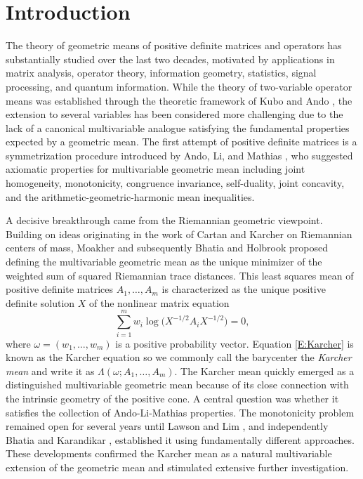 \documentclass[12pt,reqno]{amsart}
\begin{document}
\section{Introduction}
The theory of geometric means of positive definite matrices and operators has substantially studied over the last two decades, motivated by applications in matrix analysis, operator theory, information geometry, statistics, signal processing, and quantum information.
While the theory of two-variable operator means was established through the theoretic framework of Kubo and Ando \cite{KA}, the extension to several variables has been considered more challenging due to the lack of a canonical  multivariable analogue satisfying the fundamental properties expected by a geometric mean.
The first attempt of positive definite matrices is a symmetrization procedure introduced by Ando, Li, and Mathias \cite{ALM}, who suggested axiomatic properties for  multivariable geometric mean including joint homogeneity, monotonicity, congruence invariance, self-duality, joint concavity, and the arithmetic-geometric-harmonic mean inequalities.

A decisive breakthrough came from the Riemannian geometric viewpoint. Building on ideas originating in the work of Cartan and Karcher on Riemannian centers of mass, Moakher \cite{Mo} and subsequently Bhatia and Holbrook \cite{BH} proposed defining the  multivariable geometric mean as the unique minimizer of the weighted sum of squared Riemannian trace distances.
This least squares mean of positive definite matrices $A_{1}, \dots, A_{m}$ is characterized as the unique positive definite solution $X$ of the nonlinear matrix equation
\begin{equation} \label{E:Karcher}
\sum_{i=1}^{m} w_i \log \bigl( X^{-1/2} A_i X^{-1/2} \bigr) = 0,
\end{equation}
where $\omega = (w_{1}, \dots, w_{m})$ is a positive probability vector.
Equation \eqref{E:Karcher} is known as the Karcher equation so we commonly call the barycenter the \emph{Karcher mean} and write it as $\Lambda(\omega; A_1, \ldots, A_m)$.
The Karcher mean quickly emerged as a distinguished  multivariable geometric mean because of its close connection with the intrinsic geometry of the positive cone.
A central question was whether it satisfies the collection of Ando-Li-Mathias properties.
The monotonicity problem remained open for several years until Lawson and Lim \cite{LL11}, and independently Bhatia and Karandikar \cite{BK}, established it using fundamentally different approaches.
These developments confirmed the Karcher mean as a natural multivariable extension of the geometric mean and stimulated extensive further investigation.
\end{document}

